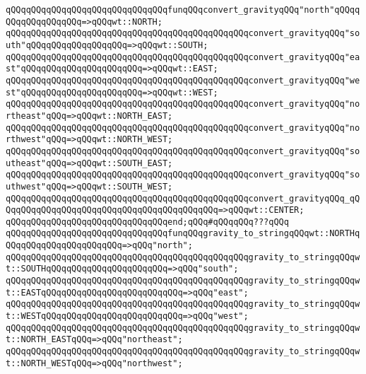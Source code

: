 \verb|qQQqqQQqqQQqqQQqqQQqqQQqqQQqqQQqfunqQQqconvert_gravityqQQq"north"qQQqqQQqqQQqqQQqqQQq=>qQQqwt::NORTH;|\newline
\verb|qQQqqQQqqQQqqQQqqQQqqQQqqQQqqQQqqQQqqQQqqQQqqQQqconvert_gravityqQQq"south"qQQqqQQqqQQqqQQqqQQq=>qQQqwt::SOUTH;|\newline
\verb|qQQqqQQqqQQqqQQqqQQqqQQqqQQqqQQqqQQqqQQqqQQqqQQqconvert_gravityqQQq"east"qQQqqQQqqQQqqQQqqQQqqQQq=>qQQqwt::EAST;|\newline
\verb|qQQqqQQqqQQqqQQqqQQqqQQqqQQqqQQqqQQqqQQqqQQqqQQqconvert_gravityqQQq"west"qQQqqQQqqQQqqQQqqQQqqQQq=>qQQqwt::WEST;|\newline
\verb|qQQqqQQqqQQqqQQqqQQqqQQqqQQqqQQqqQQqqQQqqQQqqQQqconvert_gravityqQQq"northeast"qQQq=>qQQqwt::NORTH_EAST;|\newline
\verb|qQQqqQQqqQQqqQQqqQQqqQQqqQQqqQQqqQQqqQQqqQQqqQQqconvert_gravityqQQq"northwest"qQQq=>qQQqwt::NORTH_WEST;|\newline
\verb|qQQqqQQqqQQqqQQqqQQqqQQqqQQqqQQqqQQqqQQqqQQqqQQqconvert_gravityqQQq"southeast"qQQq=>qQQqwt::SOUTH_EAST;|\newline
\verb|qQQqqQQqqQQqqQQqqQQqqQQqqQQqqQQqqQQqqQQqqQQqqQQqconvert_gravityqQQq"southwest"qQQq=>qQQqwt::SOUTH_WEST;|\newline
\verb|qQQqqQQqqQQqqQQqqQQqqQQqqQQqqQQqqQQqqQQqqQQqqQQqconvert_gravityqQQq_qQQqqQQqqQQqqQQqqQQqqQQqqQQqqQQqqQQqqQQqqQQq=>qQQqwt::CENTER;|\newline
\verb|qQQqqQQqqQQqqQQqqQQqqQQqqQQqqQQqend;qQQq#qQQqqQQq???qQQq|\newline
\newline
\verb|qQQqqQQqqQQqqQQqqQQqqQQqqQQqqQQqfunqQQqgravity_to_stringqQQqwt::NORTHqQQqqQQqqQQqqQQqqQQqqQQq=>qQQq"north";|\newline
\verb|qQQqqQQqqQQqqQQqqQQqqQQqqQQqqQQqqQQqqQQqqQQqqQQqgravity_to_stringqQQqwt::SOUTHqQQqqQQqqQQqqQQqqQQqqQQq=>qQQq"south";|\newline
\verb|qQQqqQQqqQQqqQQqqQQqqQQqqQQqqQQqqQQqqQQqqQQqqQQqgravity_to_stringqQQqwt::EASTqQQqqQQqqQQqqQQqqQQqqQQqqQQq=>qQQq"east";|\newline
\verb|qQQqqQQqqQQqqQQqqQQqqQQqqQQqqQQqqQQqqQQqqQQqqQQqgravity_to_stringqQQqwt::WESTqQQqqQQqqQQqqQQqqQQqqQQqqQQq=>qQQq"west";|\newline
\verb|qQQqqQQqqQQqqQQqqQQqqQQqqQQqqQQqqQQqqQQqqQQqqQQqgravity_to_stringqQQqwt::NORTH_EASTqQQq=>qQQq"northeast";|\newline
\verb|qQQqqQQqqQQqqQQqqQQqqQQqqQQqqQQqqQQqqQQqqQQqqQQqgravity_to_stringqQQqwt::NORTH_WESTqQQq=>qQQq"northwest";|\newline
